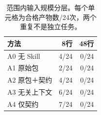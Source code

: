 \begin{table}[t]
\caption{范围内输入规模分层。每个单元格为合格产物数/24次，两个重复不是独立任务。}\label{tab:sizes}
\centering\small
\begin{tabularx}{\columnwidth}{Xrr}
\toprule
方法 & 8行 & 48行 \\
\midrule
A0 无 Skill & 4/24 & 0/24 \\
A1 原始包 & 2/24 & 0/24 \\
A2 原包＋契约 & 4/24 & 0/24 \\
A3 无关上下文 & 6/24 & 0/24 \\
A4 仅契约 & 7/24 & 0/24 \\
\bottomrule
\end{tabularx}
\end{table}
